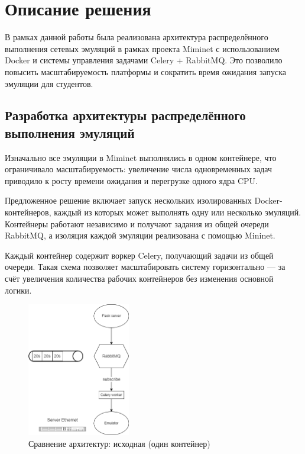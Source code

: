 
\section{Описание решения}
\label{sec:solution}

В рамках данной работы была реализована архитектура распределённого выполнения сетевых эмуляций в рамках проекта Miminet\cite{miminet} с использованием Docker и системы управления задачами Celery + RabbitMQ\cite{rabbitmq}.
Это позволило повысить масштабируемость платформы и сократить время ожидания запуска эмуляции для студентов.

\subsection{Разработка архитектуры распределённого выполнения эмуляций}
\label{subsec:task1}

Изначально все эмуляции в Miminet\cite{miminet} выполнялись в одном контейнере, что ограничивало масштабируемость: увеличение числа одновременных задач приводило к росту времени ожидания и перегрузке одного ядра CPU.

Предложенное решение включает запуск нескольких изолированных Docker-контейнеров, каждый из которых может выполнять одну или несколько эмуляций. Контейнеры работают независимо и получают задания из общей очереди RabbitMQ\cite{rabbitmq}, а изоляция каждой эмуляции реализована с помощью Mininet\cite{mininet}.

Каждый контейнер содержит воркер Celery\cite{celery}, получающий задачи из общей очереди. Такая схема позволяет масштабировать систему горизонтально — за счёт увеличения количества рабочих контейнеров без изменения основной логики.

\begin{figure}[H]
  \centering
  \includegraphics[width=0.40\textwidth]{figures/seq.png}
  \caption{Сравнение архитектур: исходная (один контейнер)}
  \label{fig:arch_compare}
\end{figure}

